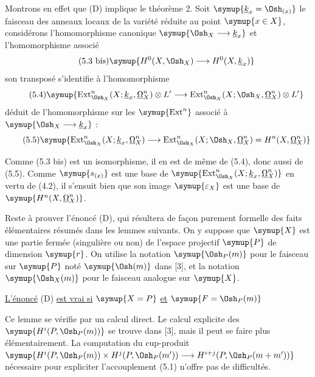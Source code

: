 Montrons en effet que (D) implique le théorème 2. Soit
$\symup{\underline{k}_x=\Osh_{(x)}}$ le faisceau des anneaux locaux de la variété réduite au point
$\symup{x\in X}$, considérons l'homomorphisme canonique
$\symup{\Osh_X\longrightarrow \underline{k}_x}$ et l'homomorphisme associé
\begin{equation}\tag{5.3 bis}
  \symup{H^{0}(X,\Osh_X)\longrightarrow H^{0}(X,\underline{k}_x)}
\end{equation}
son transposé s'identifie à l'homomorphisme
\begin{equation}\tag{5.4}
  \symup{\operatorname{Ext}_{\Osh_X}^{n}(X;\underline{k}_x,\underline{\Omega}_X^{n})\otimes L'
  \longrightarrow
  \operatorname{Ext}_{\Osh_X}^{n}(X;\Osh_X,\underline{\Omega}_X^{n})\otimes L'}
\end{equation}
déduit de l'homomorphisme sur les $\symup{\operatorname{Ext}^{n}}$ associé à
$\symup{\Osh_X\longrightarrow \underline{k}_x}$ :
\begin{equation}\tag{5.5}
  \symup{\operatorname{Ext}_{\Osh_X}^{n}(X;\underline{k}_x,\underline{\Omega}_X^{n})
  \longrightarrow
  \operatorname{Ext}_{\Osh_X}^{n}(X;\Osh_X,\underline{\Omega}_X^{n})
  =H^{n}(X,\underline{\Omega}_X^{n})}
\end{equation}

Comme (5.3 bis) est un isomorphisme, il en est de même
de (5.4), donc aussi de (5.5). Comme $\symup{s_{(x)}}$ est une base de
$\symup{\operatorname{Ext}_{\Osh_X}^{n}(X;\underline{k}_x,\underline{\Omega}_X^{n})}$ en vertu de (4.2), il
s'ensuit bien que son image $\symup{\varepsilon_X}$ est une base de
$\symup{H^{n}(X,\underline{\Omega}_X^{n})}$.

Reste à prouver l'énoncé (D), qui résultera de façon purement formelle des faits
élémentaires résumés dans les lemmes suivants. On y suppose que $\symup{X}$ est une
partie fermée (singulière ou non) de l'espace projectif $\symup{P}$ de dimension $\symup{r}$.
On utilise la notation $\symup{\Osh_P(m)}$ pour le faisceau sur $\symup{P}$ noté $\symup{\Osh(m)}$ dans
[3], et la notation $\symup{\Osh_X(m)}$ pour le faisceau analogue sur $\symup{X}$.

 \uline{L'énoncé} (D) \uline{est vrai si} $\symup{X=P}$ \uline{et} $\symup{F=\Osh_P(m)}$

Ce lemme se vérifie par un calcul direct. Le calcul explicite des
$\symup{H^{i}(P,\Osh_P(m))}$ se trouve dans [3], mais il peut se faire plus
élémentairement. La computation du cup-produit $\symup{H^{i}(P,\Osh_P(m))\times H^{j}(P,\Osh_P(m'))\longrightarrow H^{i+j}(P,\Osh_P(m+m'))}$ nécessaire pour expliciter l'accouplement (5.1) n'offre pas de
difficultés.

